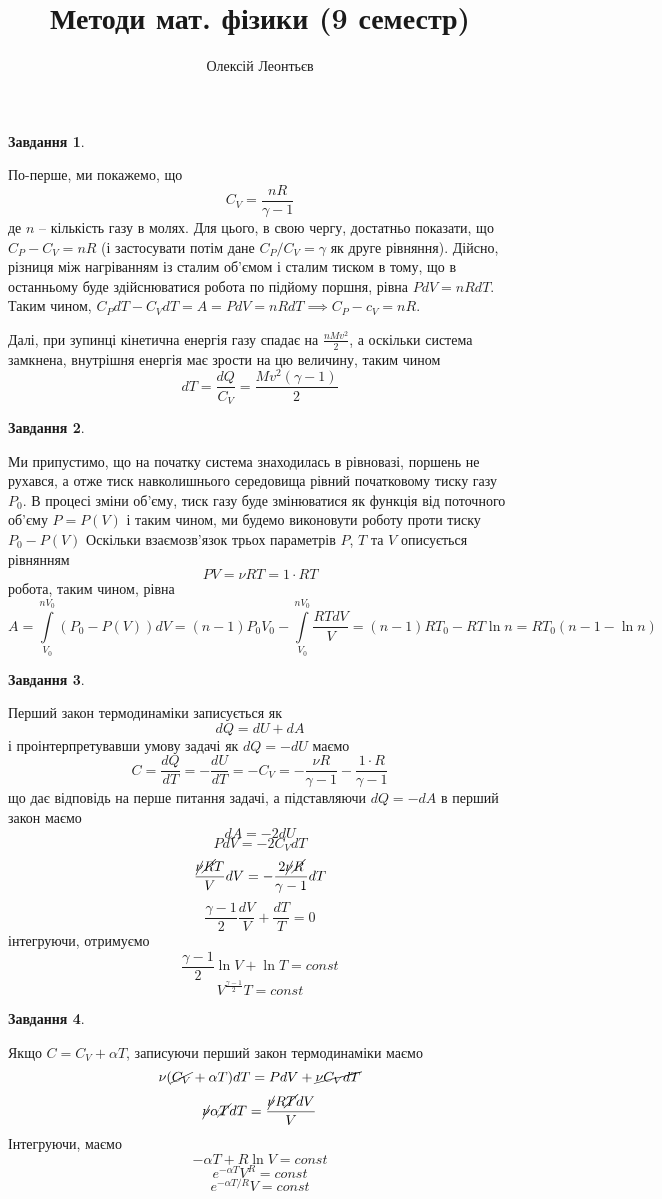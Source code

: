 \documentclass[12pt]{article} %
\title{Методи мат. фізики (9 семестр)}
\author{Олексій Леонтьєв}
\newtheorem{prob}{Завдання}
\let\oldint\int
\renewcommand{\int}{\oldint\limits}
\begin{document}
\maketitle
\begin{prob}\end{prob}
	По-перше, ми покажемо, що \[C_V=\frac{nR}{\gamma-1}\]
	де $n$ -- кількість газу в молях. Для цього, в свою чергу, достатньо показати, що $C_P-C_V=nR$ (і застосувати потім дане $C_P/C_V=\gamma$
	як друге рівняння). Дійсно, різниця між нагріванням із сталим об’ємом і сталим тиском в тому, що в останньому буде здійснюватися робота по
	підйому поршня, рівна $PdV=nRdT$. Таким чином, $C_PdT-C_VdT=A=PdV=nRdT\implies C_P-c_V=nR$.

	Далі, при зупинці кінетична енергія газу спадає на $\frac{nMv^2}{2}$, а оскільки система замкнена, внутрішня енергія має зрости на цю
	величину, таким чином
	\[dT=\frac{dQ}{C_V}=\frac{Mv^2(\gamma-1)}{2}\]
\begin{prob}\end{prob}
	Ми припустимо, що на початку система знаходилась в рівновазі, поршень не рухався, а отже тиск навколишнього середовища рівний початковому
	тиску газу $P_0$. В процесі зміни об’єму, тиск газу буде змінюватися як функція від поточного об’єму $P=P(V)$ і таким чином, ми
	будемо виконовути роботу проти тиску $P_0-P(V)$ 
	Оскільки  взаємозв’язок трьох параметрів $P$, $T$ та $V$ описується рівнянням
	\[PV=\nu RT=1\cdot RT\]
	робота, таким чином, рівна 
	\[A=\int_{V_0}^{nV_0}(P_0-P(V))dV=(n-1)P_0V_0-\int_{V_0}^{nV_0}\frac{RTdV}{V}=(n-1)RT_0-RT\ln n=RT_0(n-1-\ln n)\]
\begin{prob}\end{prob}
	Перший закон термодинаміки записується як
	\[dQ=dU+dA\]
	і проінтерпретувавши умову задачі як $dQ=-dU$ маємо
	\[C=\frac{dQ}{dT}=-\frac{dU}{dT}=-C_V=-\frac{\nu R}{\gamma-1}-\frac{1\cdot R}{\gamma-1}\]
	що дає відповідь на перше питання задачі, а підставляючи $dQ=-dA$ в перший закон маємо
	\[dA=-2dU\]
	\[PdV=-2C_VdT\]
	\[\frac{ \cancel{\nu}\cancel{ R}T}{V}dV=-\frac{2\cancel{\nu}\cancel{ R}}{\gamma-1}dT\]
	\[\frac{\gamma-1}{2}\frac{dV}{V}+\frac{dT}{T}=0\]
	інтегруючи, отримуємо
	\[\frac{\gamma-1}{2}\ln V+\ln T=const\]
	\[V^{\frac{\gamma-1}{2}}T=const\]
\begin{prob}\end{prob}
	Якщо $C=C_V+\alpha T$, записуючи перший закон термодинаміки маємо
	\[\nu (\cancel{C_V}+\alpha T)dT=PdV+\cancel{\nu C_VdT}\]
	\[\cancel{\nu}\alpha \cancel{T}dT=\frac{\cancel{\nu} R\cancel{T}dV}{V}\]
	Інтегруючи, маємо
	\[-\alpha T+R\ln V=const\]
	\[e^{-\alpha T}V^R=const\]
	\[e^{-\alpha T/R}V=const\]
\end{document}
